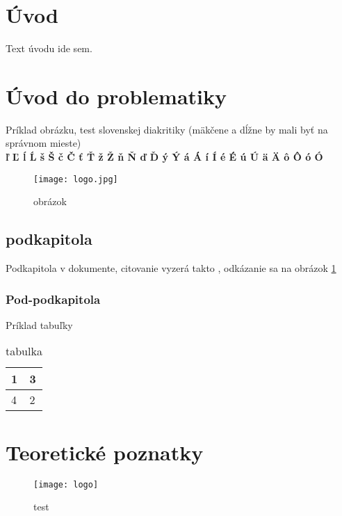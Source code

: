\documentclass[12pt]{article}
\begin{document}
%


\newpage %
\tableofcontents
\newpage
\listoffigures
\newpage
\listoftables


\newpage
\pagestyle{fancy}
\setcounter{page}{1} %
\section*{Úvod} %
Text úvodu ide sem.

\newpage
\section{Úvod do problematiky}
Príklad obrázku, test slovenskej diakritiky (mäkčene a dĺžne by mali byť na správnom mieste) \\
\textbf{ľ Ľ ĺ Ĺ š Š č Č ť Ť ž Ž ň Ň ď Ď ý Ý á Á í Í é É ú Ú ä Ä ô Ô ó Ó}
\begin{figure}[H] %
\centering
\texttt{[image: logo.jpg]}
\caption{obrázok}
\label{img:obrazok}
\end{figure}
\subsection{podkapitola}
Podkapitola v dokumente, citovanie vyzerá takto \cite{modernrob}, odkázanie sa na obrázok \ref{img:obrazok}
\subsubsection{Pod-podkapitola}
Príklad tabuľky
\begin{table}[H]
	\centering
	\caption{tabulka}
	\label{tab:my-table}
	\begin{tabular}{|l|l|}
		\hline
		1 & 3 \\ \hline
		4 & 2 \\ \hline
	\end{tabular}
\end{table}
\section{Teoretické poznatky}
\begin{figure}[H] %
\centering
\texttt{[image: logo]}
\caption{test}
\label{img:test}
\end{figure}
\end{document}
